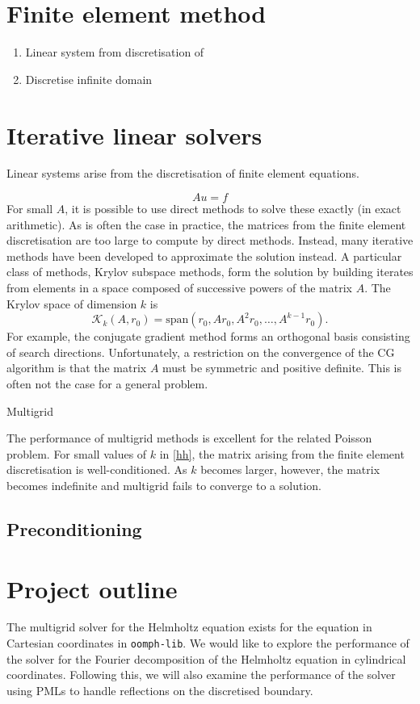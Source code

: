 \section{Finite element method}

\begin{enumerate}
\item Linear system from discretisation of 
\item Discretise infinite domain 
\end{enumerate}


\section{Iterative linear solvers}

Linear systems arise from the discretisation of finite element equations.

\[
	A u = f
\]
For small $A$, it is possible to use direct methods to solve these exactly (in exact arithmetic).
As is often the case in practice, the matrices from the finite element discretisation are too large to compute by direct methods.
Instead, many iterative methods have been developed to approximate the solution instead.
A particular class of methods, Krylov subspace methods, form the solution by building iterates from elements in a space composed of successive powers of the matrix $A$.
The Krylov space of dimension $k$ is 
\[
	\mathcal{K}_k(A, r_0) = \mathrm{span}(r_0, Ar_0, A^2 r_0, \ldots, A^{k-1} r_0).
\]
For example, the conjugate gradient method forms an orthogonal basis consisting of search directions.
Unfortunately, a restriction on the convergence of the CG algorithm is that the matrix $A$ must be symmetric and positive definite.
This is often not the case for a general problem.

Multigrid

The performance of multigrid methods is excellent for the related Poisson problem.
For small values of $k$ in \ref{hh}, the matrix arising from the finite element discretisation is well-conditioned.
As $k$ becomes larger, however, the matrix becomes indefinite and multigrid fails to converge to a solution.


\subsection{Preconditioning}








\section{Project outline}

The multigrid solver for the Helmholtz equation exists for the equation in Cartesian coordinates in \texttt{oomph-lib}.
We would like to explore the performance of the solver for the Fourier decomposition of the Helmholtz equation in cylindrical coordinates.
Following this, we will also examine the performance of the solver using PMLs to handle reflections on the discretised boundary.

